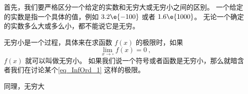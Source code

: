 

首先，我们要严格区分一个给定的实数和无穷大或无穷小之间的区别。 一个给定的实数是指一个具体的值，例如 $3.2\e{-100}$ 或者 $1.6\e{1000}$。 无论一个确定的实数多么大或多么小，都不能说它是无穷。

无穷小是一个过程，具体来在求函数 $f(x)$ 的极限时，如果
\begin{equation}\label{eq_InfOrd_1}
\lim_{x\to \square} f(x) = 0~,
\end{equation}
$f(x)$ 就可以叫做无穷小。 如果我们说一个符号或者函数是无穷小，那么就暗含者我们在讨论某个\autoref{eq_InfOrd_1} 这样的极限。

同理，无穷大